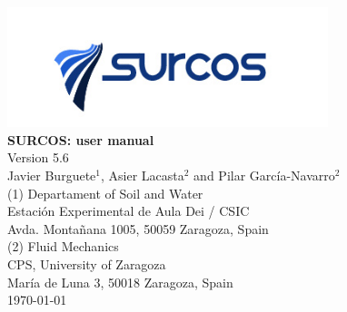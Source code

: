 \documentclass[11pt, twoside, openany, a4paper]{book}
\begin{document}

\nocite{*}




\pagestyle{empty}

\begin{titlepage} 
\begin{center} 
 
\includegraphics*[height=3.5cm]{images/logo_surcos.png}\\ 

\vspace*{3.5cm} 
{\Huge \textbf{SURCOS: user manual\\}}
\vspace*{1cm} 
{\normalsize Version 5.6}\\
\vspace*{1cm} 
{\Large Javier Burguete$^1$, Asier Lacasta$^2$ and Pilar García-Navarro$^2$}\\ 
\vspace*{2.5cm} 
{\normalsize (1) Departament of Soil and Water}\\
{Estación Experimental de Aula Dei / CSIC}\\ 
{Avda. Montañana 1005, 50059 Zaragoza, Spain}\\ 
\vspace*{1cm} 
{\normalsize (2) Fluid Mechanics}\\ 
{CPS, University of Zaragoza}\\ 
{María de Luna 3, 50018 Zaragoza, Spain}\\
\vspace*{1cm} 
{\normalsize \today}\\ 
\end{center} 
\end{titlepage} 
\cleardoublepage

\pagestyle{plain}

\tableofcontents
\listoffigures

\cleardoublepage

\pagestyle{headings}


\cleardoublepage


\cleardoublepage



%
\end{document}
